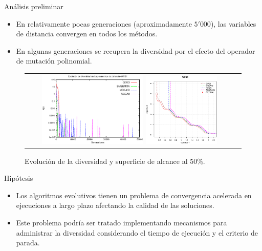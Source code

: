 \documentclass{beamer}
\begin{document}
\begin{frame}{Análisis preliminar}
\begin{itemize}
\justifying
\item En relativamente pocas generaciones (aproximadamente $5'000$), las variables de distancia convergen en todos los métodos.
\justifying
\item En algunas generaciones se recupera la diversidad por el efecto del operador de mutación polinomial.
\end{itemize}

\begin{figure}
\centering
\begin{tabular}{cc}
 \includegraphics[width=0.5\textwidth]{Images/Average_DistanceParamsStateArt.eps} 
\includegraphics[width=0.35\textwidth]{Images/WFG1_analisis.eps} %
\end{tabular}
\caption{Evolución de la diversidad y superficie de alcance al 50\%.}
\label{fig:DiversityProposal}
\end{figure}
\end{frame}


\begin{frame}{Hipótesis}
    \begin{itemize}
        \item Los algoritmos evolutivos tienen un problema de convergencia acelerada en ejecuciones a largo plazo afectando la calidad de las soluciones.
	\item Este problema podría ser tratado implementando mecanismos para administrar la diversidad considerando el tiempo de ejecución y el criterio de parada.
    \end{itemize}
\end{frame}
\end{document}
